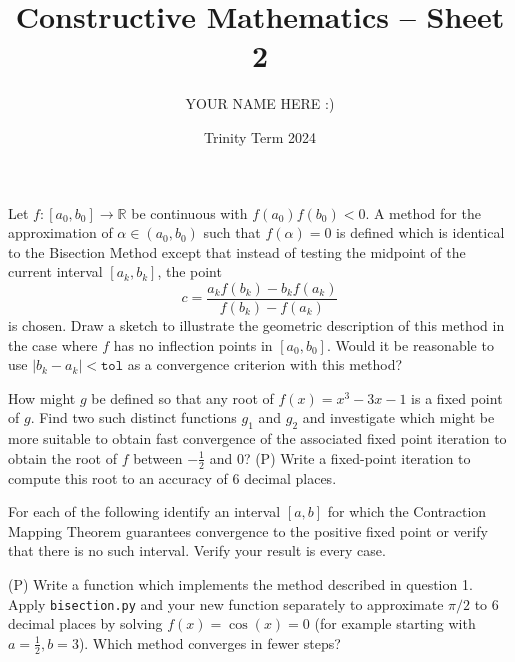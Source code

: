 \documentclass[answers]{exam}
\title{Constructive Mathematics -- Sheet 2}
\author{YOUR NAME HERE :)}
\date{Trinity Term 2024}
\begin{document}
\maketitle
\begin{questions}

\question%
Let $f:\left[a_{0}, b_{0}\right] \rightarrow \mathbb{R}$ be continuous with $f\left(a_{0}\right) f\left(b_{0}\right)<0$. A method for the approximation of $\alpha \in\left(a_{0}, b_{0}\right)$ such that $f(\alpha)=0$ is defined which is identical to the Bisection Method except that instead of testing the midpoint of the current interval $\left[a_{k}, b_{k}\right]$, the point \[
	c=\frac{a_{k} f\left(b_{k}\right)-b_{k} f\left(a_{k}\right)}{f\left(b_{k}\right)-f\left(a_{k}\right)}
\] is chosen. Draw a sketch to illustrate the geometric description of this method in the case where $f$ has no inflection points in $\left[a_{0}, b_{0}\right]$. Would it be reasonable to use $\left|b_{k}-a_{k}\right|<\mathtt{tol}$ as a convergence criterion with this method?



\question%
How might $g$ be defined so that any root of $f(x)=x^{3}-3 x-1$ is a fixed point of $g$. Find two such distinct functions $g_{1}$ and $g_{2}$ and investigate which might be more suitable to obtain fast convergence of the associated fixed point iteration to obtain the root of $f$ between $-\frac{1}{2}$ and 0? (P) Write a fixed-point iteration to compute this root to an accuracy of 6 decimal places.



\question%
For each of the following identify an interval $[a, b]$ for which the Contraction Mapping Theorem guarantees convergence to the positive fixed point or verify that there is no such interval. Verify your result is every case.



\question%
(P) Write a function which implements the method described in question 1. Apply \texttt{bisection.py} and your new function separately to approximate $\pi / 2$ to 6 decimal places by solving $f(x)=\cos (x)=0$ (for example starting with $a=\frac{1}{2}, b=3$). Which method converges in fewer steps?

\end{questions}
\end{document}
